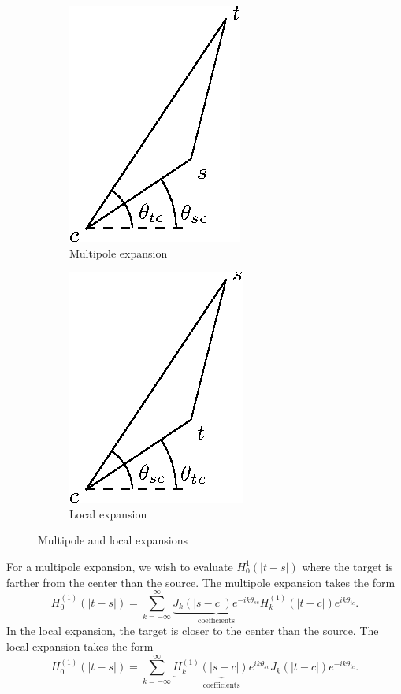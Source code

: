 \documentclass[10pt]{article}
\begin{document}
\begin{figure}[H]
\centering
\begin{subfigure}[b]{0.4\linewidth}
\centering
\includegraphics{media/m-expn.eps}
\caption{Multipole expansion}
\end{subfigure}
%
\hspace{1cm}
%
\begin{subfigure}[b]{0.4\linewidth}
\centering
\includegraphics{media/l-expn.eps}
\caption{Local expansion}
\end{subfigure}

\caption{Multipole and local expansions}

\end{figure}

For a multipole expansion, we wish to evaluate $H_0^1(|t - s|)$ where the target
is farther from the center than the source. The multipole expansion takes the
form
%
\[ H_0^{(1)}(|t - s|) = \sum_{k = -\infty}^{\infty} \underbrace{J_k(|s - c|)
  e^{- i k \theta_{sc}}}_{\textrm{coefficients}} H_k^{(1)}(|t - c|) e^{i k
  \theta_{tc}}. \]
%
In the local expansion, the target is closer to the center than the source. The
local expansion takes the form
%
\[ H_0^{(1)}(|t - s|) = \sum_{k = -\infty}^{\infty} \underbrace{H_k^{(1)}(|s -
  c|) e^{i k \theta_{sc}}}_{\textrm{coefficients}} J_k(|t - c|) e^{- i k
  \theta_{tc}}. \]
\end{document}

